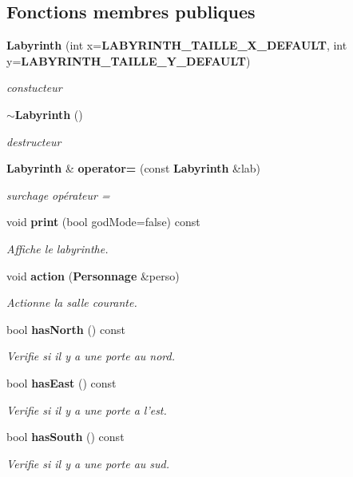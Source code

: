 \subsection*{Fonctions membres publiques}
\begin{DoxyCompactItemize}
\item 
{\bf Labyrinth} (int x={\bf L\-A\-B\-Y\-R\-I\-N\-T\-H\-\_\-\-T\-A\-I\-L\-L\-E\-\_\-\-X\-\_\-\-D\-E\-F\-A\-U\-L\-T}, int y={\bf L\-A\-B\-Y\-R\-I\-N\-T\-H\-\_\-\-T\-A\-I\-L\-L\-E\-\_\-\-Y\-\_\-\-D\-E\-F\-A\-U\-L\-T})
\begin{DoxyCompactList}\small\item\em constucteur \end{DoxyCompactList}\item 
{\bf $\sim$\-Labyrinth} ()
\begin{DoxyCompactList}\small\item\em destructeur \end{DoxyCompactList}\item 
{\bf Labyrinth} \& {\bf operator=} (const {\bf Labyrinth} \&lab)
\begin{DoxyCompactList}\small\item\em surchage opérateur = \end{DoxyCompactList}\item 
void {\bf print} (bool god\-Mode=false) const 
\begin{DoxyCompactList}\small\item\em Affiche le labyrinthe. \end{DoxyCompactList}\item 
void {\bf action} ({\bf Personnage} \&perso)
\begin{DoxyCompactList}\small\item\em Actionne la salle courante. \end{DoxyCompactList}\item 
bool {\bf has\-North} () const 
\begin{DoxyCompactList}\small\item\em Verifie si il y a une porte au nord. \end{DoxyCompactList}\item 
bool {\bf has\-East} () const 
\begin{DoxyCompactList}\small\item\em Verifie si il y a une porte a l'est. \end{DoxyCompactList}\item 
bool {\bf has\-South} () const 
\begin{DoxyCompactList}\small\item\em Verifie si il y a une porte au sud. \end{DoxyCompactList}\item 

\end{DoxyCompactItemize}
